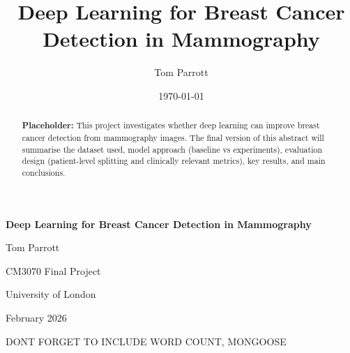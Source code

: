 \documentclass[12pt]{report}
\title{Deep Learning for Breast Cancer Detection in Mammography}
\author{Tom Parrott}
\date{\today}
\begin{document}
\begin{titlepage}
    \centering
    \vspace*{3cm}

    {\LARGE \textbf{Deep Learning for Breast Cancer Detection in Mammography}\par}
    \vspace{1.5cm}

    {\Large Tom Parrott\par}
    \vspace{0.5cm}

    {\large CM3070 Final Project\par}
    \vspace{0.5cm}

    {\large University of London\par}
    \vspace{1.5cm}

    {\large February 2026\par}

    {\large DONT FORGET TO INCLUDE WORD COUNT, MONGOOSE\par}


    \vfill
\end{titlepage}

\begin{abstract}
\noindent
\textbf{Placeholder:} This project investigates whether deep learning can improve breast cancer detection from mammography images. The final version of this abstract will summarise the dataset used, model approach (baseline vs experiments), evaluation design (patient-level splitting and clinically relevant metrics), key results, and main conclusions.
\end{abstract}

\clearpage

\tableofcontents
\clearpage

\listoffigures
\clearpage

\listoftables
\clearpage















\nocite{*}

\end{document}
